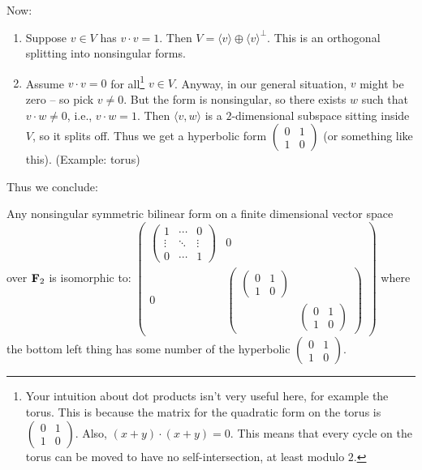 Now:
\begin{enumerate}
\item Suppose $v\in V$ has $v\cdot v=1$. Then $V=\langle v\rangle\oplus\langle v\rangle^\perp$. This is an orthogonal splitting into nonsingular forms.
\item Assume $v\cdot v=0$ for all\footnote{Your intuition about dot products isn't very useful here, for example the torus. This is because the matrix for the quadratic form on the torus is $\begin{pmatrix}0 & 1 \\ 1 & 0\end{pmatrix}$. Also, $(x+y)\cdot(x+y)=0$. This means that every cycle on the torus can be moved to have no self-intersection, at least modulo $2$.} $v\in V$. Anyway, in our general situation, $v$ might be zero -- so pick $v\neq 0$. But the form is nonsingular, so there exists $w$ such that $v\cdot w\neq 0$, i.e., $v\cdot w=1$. Then $\langle v,w\rangle$ is a $2$-dimensional subspace sitting inside $V$, so it splits off. Thus we get a hyperbolic form $\begin{pmatrix}0 & 1 \\ 1 & 0\end{pmatrix}$ (or something like this). (Example: torus)
\end{enumerate}
Thus we conclude:
\begin{prop}
Any nonsingular symmetric bilinear form on a finite dimensional vector space over $\mathbf F_2$ is isomorphic to: $\begin{pmatrix}\begin{pmatrix}1 & \cdots & 0\\ \vdots & \ddots & \vdots \\ 0 & \cdots & 1 \end{pmatrix} & 0 \\ 0 & \begin{pmatrix}\begin{pmatrix}0 & 1 \\ 1 & 0\end{pmatrix} & \\ & \begin{pmatrix}0 & 1 \\ 1 & 0\end{pmatrix}\end{pmatrix}\end{pmatrix}$ where the bottom left thing has some number of the hyperbolic $\begin{pmatrix}0 & 1 \\ 1 & 0\end{pmatrix}$.
\end{prop}
